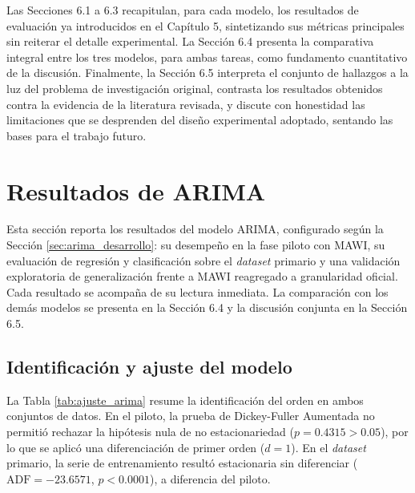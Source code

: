 \documentclass[12pt]{report}
\begin{document}
Las Secciones 6.1 a 6.3 recapitulan, para cada modelo, los resultados de evaluación ya introducidos en el Capítulo 5, sintetizando sus métricas principales sin reiterar el detalle experimental. La Sección 6.4 presenta la comparativa integral entre los tres modelos, para ambas tareas, como fundamento cuantitativo de la discusión. Finalmente, la Sección 6.5 interpreta el conjunto de hallazgos a la luz del problema de investigación original, contrasta los resultados obtenidos 
contra la evidencia de la literatura revisada, y discute con honestidad las limitaciones que se desprenden del diseño experimental adoptado, sentando las bases para el trabajo futuro.

\section{Resultados de ARIMA}
\label{sec:resultados_arima}

Esta sección reporta los resultados del modelo ARIMA, configurado según la Sección \ref{sec:arima_desarrollo}: su desempeño en la fase piloto con MAWI, su evaluación de regresión y clasificación sobre el \textit{dataset} primario y una validación exploratoria de generalización frente a MAWI reagregado a granularidad oficial. Cada resultado se acompaña de su lectura inmediata. La comparación con los demás modelos se presenta en la Sección 6.4 y la discusión conjunta en la Sección 6.5.

\subsection*{Identificación y ajuste del modelo}

La Tabla \ref{tab:ajuste_arima} resume la identificación del orden en ambos conjuntos de datos. En el piloto, la prueba de Dickey-Fuller Aumentada no permitió rechazar la hipótesis nula de no estacionariedad ($p=0.4315>0.05$), por lo que se aplicó una diferenciación de primer orden ($d=1$). En el \textit{dataset} primario, la serie de entrenamiento resultó estacionaria sin diferenciar ($\text{ADF}=-23.6571$, $p<0.0001$), a diferencia del piloto.
\end{document}
